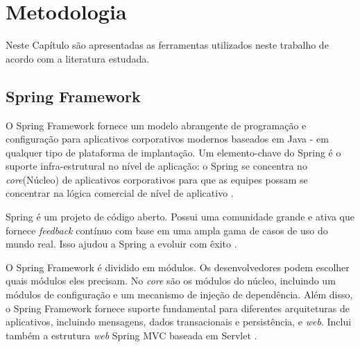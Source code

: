 
\chapter{Metodologia} \label{cap:metodologia}

Neste Capítulo são apresentadas as ferramentas utilizados neste trabalho de acordo com a literatura estudada. 

\section{Spring Framework}\label{sec:SpringFramework}

O Spring Framework fornece um modelo abrangente de programação e configuração para aplicativos corporativos modernos baseados em Java - em qualquer tipo de plataforma de implantação. Um elemento-chave do Spring é o suporte infra-estrutural no nível de aplicação: o Spring se concentra no \textit{core}(Núcleo) de aplicativos corporativos para que as equipes possam se concentrar na lógica comercial de nível de aplicativo \cite{SpringFramework:2017}.

Spring é um projeto de código aberto. Possui uma comunidade grande e ativa que fornece \textit{feedback} contínuo com base em uma ampla gama de casos de uso do mundo real. Isso ajudou a Spring a evoluir com êxito \cite{SpringFramework:2017}.

O Spring Framework é dividido em módulos. Os desenvolvedores podem escolher quais módulos eles precisam. No \textit{core} são os módulos do núcleo, incluindo um módulos de configuração e um mecanismo de injeção de dependência. Além disso, o Spring Framework fornece suporte fundamental para diferentes arquiteturas de aplicativos, incluindo mensagens, dados transacionais e persistência, e \textit{web}. Inclui também a estrutura \textit{web} Spring MVC baseada em Servlet \cite{SpringFramework:2017}.

